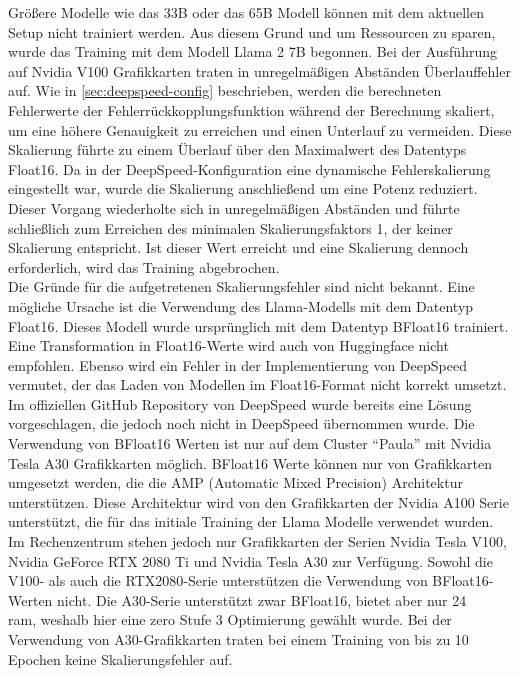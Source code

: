 Größere Modelle wie das 33B oder das 65B Modell können mit dem aktuellen Setup nicht trainiert werden.
Aus diesem Grund und um Ressourcen zu sparen, wurde das Training mit dem Modell Llama 2 7B begonnen.
Bei der Ausführung auf Nvidia V100 Grafikkarten traten in unregelmäßigen Abständen Überlauffehler auf.
Wie in \cref{sec:deepspeed-config} beschrieben, werden die berechneten Fehlerwerte der Fehlerrückkopplungsfunktion während der Berechnung skaliert, um eine höhere Genauigkeit zu erreichen und einen Unterlauf zu vermeiden.
Diese Skalierung führte zu einem Überlauf über den Maximalwert des Datentyps Float16.
Da in der DeepSpeed-Konfiguration eine dynamische Fehlerskalierung eingestellt war, wurde die Skalierung anschließend um eine Potenz reduziert.
Dieser Vorgang wiederholte sich in unregelmäßigen Abständen und führte schließlich zum Erreichen des minimalen Skalierungsfaktors 1, der keiner Skalierung entspricht.
Ist dieser Wert erreicht und eine Skalierung dennoch erforderlich, wird das Training abgebrochen.\\

Die Gründe für die aufgetretenen Skalierungsfehler sind nicht bekannt.
Eine mögliche Ursache ist die Verwendung des Llama-Modells mit dem Datentyp Float16.
Dieses Modell wurde ursprünglich mit dem Datentyp BFloat16 trainiert.
Eine Transformation in Float16-Werte wird auch von Huggingface nicht empfohlen.
Ebenso wird ein Fehler in der Implementierung von DeepSpeed vermutet, der das Laden von Modellen im Float16-Format nicht korrekt umsetzt.
Im offiziellen GitHub Repository von DeepSpeed wurde bereits eine Lösung vorgeschlagen, die jedoch noch nicht in DeepSpeed übernommen wurde.
Die Verwendung von BFloat16 Werten ist nur auf dem Cluster \enquote{Paula} mit Nvidia Tesla A30 Grafikkarten möglich.
BFloat16 Werte können nur von Grafikkarten umgesetzt werden, die die AMP (Automatic Mixed Precision) Architektur unterstützen.
Diese Architektur wird von den Grafikkarten der Nvidia A100 Serie unterstützt, die für das initiale Training der Llama Modelle verwendet wurden.
Im Rechenzentrum stehen jedoch nur Grafikkarten der Serien Nvidia Tesla V100, Nvidia GeForce RTX 2080 Ti und Nvidia Tesla A30 zur Verfügung.
Sowohl die V100- als auch die RTX2080-Serie unterstützen die Verwendung von BFloat16-Werten nicht.
Die A30-Serie unterstützt zwar BFloat16, bietet aber nur \SI{24}{\giga\byte} \ac{ram}, weshalb hier eine \ac{zero} Stufe 3 Optimierung gewählt wurde.
Bei der Verwendung von A30-Grafikkarten traten bei einem Training von bis zu 10 Epochen keine Skalierungsfehler auf.\\

